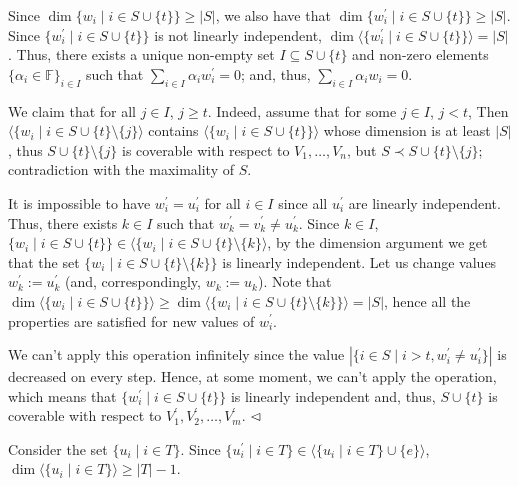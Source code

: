 \documentclass[10pt,a4paper]{article}
\begin{document}
Since $\dim\{w_{i}\mid i\in S\cup\{t\}\}\geq|S|$, we also have that $\dim\{w^{\prime}_{i}\mid i\in S\cup\{t\}\}\geq|S|$. Since $\{w_{i}^{\prime}\mid i\in S\cup\{t\}\}$ is not linearly independent, $\dim\langle\{w^{\prime}_{i}\mid i\in S\cup\{t\}\}\rangle=|S|$. Thus, there exists a unique non-empty set $I\subseteq S\cup\{t\}$ and non-zero elements $\{\alpha_{i}\in\mathbb{F}\}_{i\in I}$ such that $\sum_{i\in I}\alpha_{i}w^{\prime}_{i}=0$; and, thus, $\sum_{i\in I}\alpha_{i}w_{i}=0$.\par



We claim that for all $j\in I$, $j\geq t$. Indeed, assume that for some $j\in I$, $j<t$, Then $\langle\{w_{i}\mid i\in S\cup\{t\}\setminus\{j\}\rangle$ contains $\langle\{w_{i}\mid i\in S\cup\{t\}\}\rangle$ whose dimension is at least $|S|$, thus $S\cup\{t\}\setminus\{j\}$ is coverable with respect to $V_{1},\dots,V_{n}$, but $S\prec S\cup\{t\}\setminus\{j\}$; contradiction with the maximality of $S$.\par



It is impossible to have $w^{\prime}_{i}=u^{\prime}_{i}$ for all $i\in I$ since all $u^{\prime}_{i}$ are linearly independent. Thus, there exists $k\in I$ such that $w^{\prime}_{k}=v^{\prime}_{k}\neq u^{\prime}_{k}$. Since $k\in I$, $\{w_{i}\mid i\in S\cup\{t\}\}\in\langle\{w_{i}\mid i\in S\cup\{t\}\setminus\{k\}\rangle$,
by the dimension argument we get that the set $\{w_{i}\mid i\in S\cup\{t\}\setminus\{k\}\}$ is linearly independent. Let us change values $w^{\prime}_{k}:=u^{\prime}_{k}$ (and, correspondingly, $w_{k}:=u_{k}$). Note that $\dim\langle\{w_{i}\mid i\in S\cup\{t\}\}\rangle\geq\dim\langle\{w_{i}\mid i\in
S\cup\{t\}\setminus\{k\}\}\rangle=|S|$, hence all the properties are satisfied for new values of $w_{i}^{\prime}$.\par



We can’t apply this operation infinitely since the value $|\{i\in S\mid i>t,w_{i}^{\prime}\neq u_{i}^{\prime}\}|$ is decreased on every step. Hence, at some moment, we can’t apply the operation, which means that $\{w^{\prime}_{i}\mid i\in S\cup\{t\}\}$ is linearly independent and, thus, $S\cup\{t\}$ is coverable with respect to $V_{1}^{\prime},V_{2}^{\prime},\dots,V_{m}^{\prime}$.
$\hfill\vartriangleleft$\par



Consider the set $\{u_{i}\mid i\in T\}$. Since $\{u^{\prime}_{i}\mid i\in T\}\in\langle\{u_{i}\mid i\in T\}\cup\{e\}\rangle$, $\dim\langle\{u_{i}\mid i\in T\}\rangle\geq|T|-1$.\par
\end{document}
